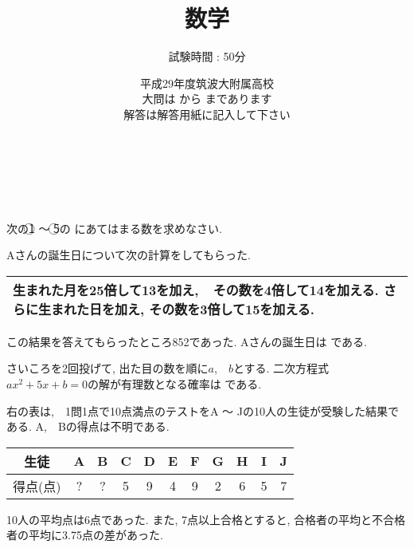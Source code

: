 \documentclass[dvipdfmx, titlepage, 11pt]{jsarticle}
\title{\Huge 数学}
\author{\LARGE 試験時間 : 50分}
\date{\LARGE 平成29年度筑波大附属高校\\[3cm] 大問は \fbox{\Large {\bf 1}} から \fbox{\Large {\bf 5}} まであります\\[0.5cm] 解答は解答用紙に記入して下さい}
\newcommand{\nbox}[1]{\fbox{\hspace{5pt} \textcircled{\scriptsize #1}\hspace{5pt} }}
\begin{document}
\maketitle

\newpage
\thispagestyle{empty}
　
\newpage

\newpage
\thispagestyle{empty}
　
\newpage

\setcounter{page}{1}
\noindent {}\hspace{10pt} 次の\textcircled{\scriptsize 1} 〜 \textcircled{\scriptsize 5}の \fbox{　\hspace{10pt} } にあてはまる数を求めなさい.
\begin{enumerate}[(1)]
\item Aさんの誕生日について次の計算をしてもらった.
  \begin{center}
    \begin{tabular}{|p{14cm}|} \hline
      生まれた月を25倍して13を加え,\ \ その数を4倍して14を加える. さらに生まれた日を加え, その数を3倍して15を加える. \\ \hline
    \end{tabular}
  \end{center}
  この結果を答えてもらったところ852であった. Aさんの誕生日は \nbox{1} である.\\[3cm]
\item さいころを2回投げて, 出た目の数を順に$a$,\ \ $b$とする. 二次方程式$ax^{2}+5x+b=0$の解が有理数となる確率は \nbox{2} である.\\[3cm]
  
  \begin{minipage}{0.4\hsize}
  \item 右の表は,\ \ 1問1点で10点満点のテストをA 〜 Jの10人の生徒が受験した結果である. A,\ \ Bの得点は不明である.
  \end{minipage}
  \begin{minipage}{0.55\hsize}
    \begin{center}
      \begin{tabular}{|c|c|c|c|c|c|c|c|c|c|c|} \hline
        生徒&A&B&C&D&E&F&G&H&I&J\\ \hline
        得点(点)&?&?&5&9&4&9&2&6&5&7\\ \hline
      \end{tabular}
    \end{center}
  \end{minipage}
  
  10人の平均点は6点であった. また, 7点以上合格とすると, 合格者の平均と不合格者の平均に3.75点の差があった.


\end{enumerate}
\end{document}
